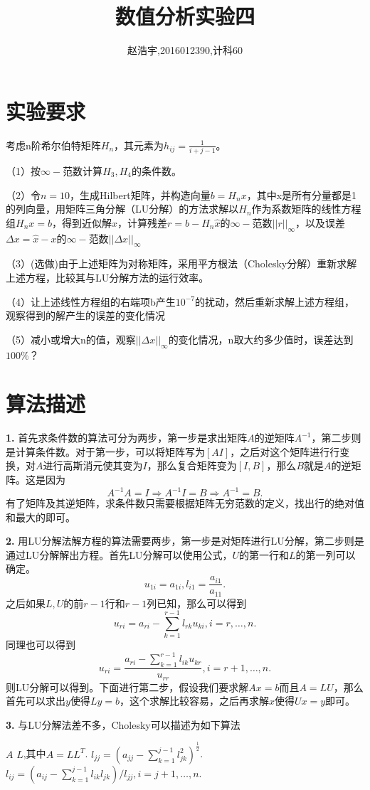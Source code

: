 \documentclass{article}
\title{\bf\huge 数值分析实验四}
\author{赵浩宇,2016012390,计科60}
\theoremstyle{plain}
\theoremstyle{definition}
\theoremstyle{remark}
\begin{document}
\maketitle

\section{实验要求}
考虑n阶希尔伯特矩阵$H_n$，其元素为$h_{ij}=\frac1{i+j-1}$。

（1）按$\infty-$范数计算$H_3,H_4$的条件数。

（2）令$n=10$，生成Hilbert矩阵，并构造向量$b=H_nx$，其中x是所有分量都是1的列向量，用矩阵三角分解（LU分解）的方法求解以$H_n$作为系数矩阵的线性方程组$H_nx=b$，得到近似解$\hat x$，计算残差$r=b-H_n\hat x$的$\infty-$范数$||r||_{\infty}$，以及误差$\Delta x=\hat x-x$的$\infty-$范数$||\Delta x||_{\infty}$

（3）(选做)由于上述矩阵为对称矩阵，采用平方根法（Cholesky分解）重新求解上述方程，比较其与LU分解方法的运行效率。

（4）让上述线性方程组的右端项b产生$10^{-7}$的扰动，然后重新求解上述方程组，观察得到的解产生的误差的变化情况

（5）减小或增大n的值，观察$||\Delta x||_{\infty}$的变化情况，n取大约多少值时，误差达到$100\%$？

\section{算法描述}
\textbf{1.} 首先求条件数的算法可分为两步，第一步是求出矩阵$A$的逆矩阵$A^{-1}$，第二步则是计算条件数。对于第一步，可以将矩阵写为$[A I]$，之后对这个矩阵进行行变换，对$A$进行高斯消元使其变为$I$，那么复合矩阵变为$[I,B]$，那么$B$就是$A$的逆矩阵。这是因为
\[A^{-1}A = I \Rightarrow A^{-1}I = B \Rightarrow A^{-1} = B.\]
有了矩阵及其逆矩阵，求条件数只需要根据矩阵无穷范数的定义，找出行的绝对值和最大的即可。

\textbf{2.} 用LU分解法解方程的算法需要两步，第一步是对矩阵进行LU分解，第二步则是通过LU分解解出方程。首先LU分解可以使用公式，$U$的第一行和$L$的第一列可以确定。
\[u_{1i} = a_{1i}, l_{i1} = \frac{a_{i1}}{a_11}.\]
之后如果$L,U$的前$r-1$行和$r-1$列已知，那么可以得到
\[u_{ri} = a_{ri} - \sum_{k=1}^{r-1}l_{rk}u_{ki},i = r,\dots,n.\]
同理也可以得到
\[u_{ri} = \frac{a_{ri} - \sum_{k=1}^{r-1}l_{ik}u_{kr}}{u_{rr}},i = r+1,\dots,n.\]
则LU分解可以得到。下面进行第二步，假设我们要求解$Ax = b$而且$A = LU$，那么首先可以求出$y$使得$Ly = b$，这个求解比较容易，之后再求解$x$使得$Ux = y$即可。

\textbf{3.} 与LU分解法差不多，Cholesky可以描述为如下算法
\begin{algorithm}[!htbp]
    \centering
    \begin{algorithmic}[1]
        \Require $A$
        \Ensure $L$,其中$A = LL^T$.
                \State $l_{jj} = (a_{jj} - \sum_{k=1}^{j-1}l_{jk}^2)^{\frac{1}{2}}$.
                \State $l_{ij} = (a_{ij} - \sum_{k=1}^{j-1}l_{ik}l_{jk})/l_{jj},i = j+1,\dots,n$.
            \EndFor
        \EndProcedure
    \end{algorithmic}
\end{algorithm}
\end{document}
